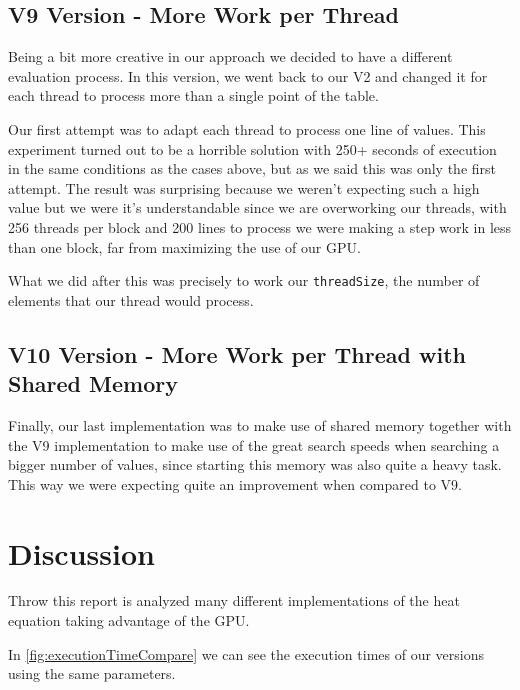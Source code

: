 \documentclass[conference]{IEEEtran}
\begin{document}
\subsection{V9 Version - More Work per Thread}
Being a bit more creative in our approach we decided to have a different evaluation process. In this version, we went back to our V2 and changed it for each thread to process more than a single point of the table.

Our first attempt was to adapt each thread to process one line of values. This experiment turned out to be a horrible solution with 250+ seconds of execution in the same conditions as the cases above, but as we said this was only the first attempt. The result was surprising because we weren't expecting such a high value but we were it's understandable since we are overworking our threads, with 256 threads per block and 200 lines to process we were making a step work in less than one block, far from maximizing the use of our GPU.

What we did after this was precisely to work our \texttt{threadSize}, the number of elements that our thread would process.


\subsection{V10 Version - More Work per Thread with Shared Memory}

Finally, our last implementation was to make use of shared memory together with the V9 implementation to make use of the great search speeds when searching a bigger number of values, since starting this memory was also quite a heavy task. This way we were expecting quite an improvement when compared to V9.


\section{Discussion}

Throw this report is analyzed many different implementations of the heat equation taking advantage of the GPU.

In \autoref{fig:executionTimeCompare} we can see the execution times of our versions using the same parameters.
\end{document}
